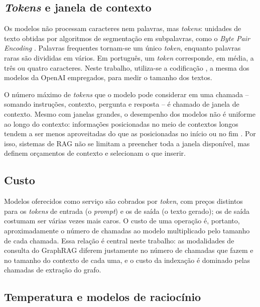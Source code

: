\subsection{\textit{Tokens} e janela de contexto}
\label{sec-referencial-llm-tokens}

Os modelos não processam caracteres nem palavras, mas \textit{tokens}: unidades de texto obtidas por algoritmos de segmentação em subpalavras, como o \textit{Byte Pair Encoding} \cite{sennrich2016bpe}. Palavras frequentes tornam-se um único \textit{token}, enquanto palavras raras são divididas em vários. Em português, um \textit{token} corresponde, em média, a três ou quatro caracteres. Neste trabalho, utiliza-se a codificação , a mesma dos modelos da OpenAI empregados, para medir o tamanho dos textos.

O número máximo de \textit{tokens} que o modelo pode considerar em uma chamada -- somando instruções, contexto, pergunta e resposta -- é chamado de janela de contexto. Mesmo com janelas grandes, o desempenho dos modelos não é uniforme ao longo do contexto: informações posicionadas no meio de contextos longos tendem a ser menos aproveitadas do que as posicionadas no início ou no fim \cite{liu2024lost}. Por isso, sistemas de RAG não se limitam a preencher toda a janela disponível, mas definem orçamentos de contexto e selecionam o que inserir.

\subsection{Custo}
\label{sec-referencial-llm-custo}

Modelos oferecidos como serviço são cobrados por \textit{token}, com preços distintos para os \textit{tokens} de entrada (o \textit{prompt}) e os de saída (o texto gerado); os de saída costumam ser várias vezes mais caros. O custo de uma operação é, portanto, aproximadamente o número de chamadas ao modelo multiplicado pelo tamanho de cada chamada. Essa relação é central neste trabalho: as modalidades de consulta do GraphRAG diferem justamente no número de chamadas que fazem e no tamanho do contexto de cada uma, e o custo da indexação é dominado pelas chamadas de extração do grafo.

\subsection{Temperatura e modelos de raciocínio}
\label{sec-referencial-llm-temperatura}

